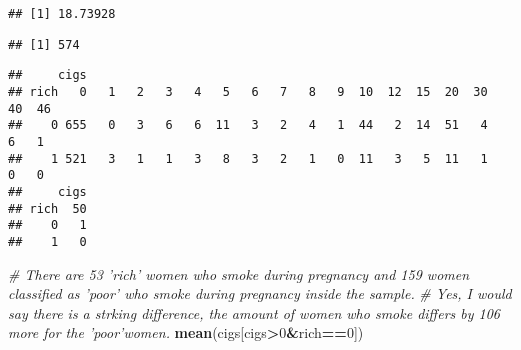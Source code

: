 \documentclass[]{article}
\newenvironment{Shaded}{\begin{snugshade}}{\end{snugshade}}
\newcommand{\CommentTok}[1]{\textcolor[rgb]{0.56,0.35,0.01}{\textit{#1}}}
\newcommand{\DecValTok}[1]{\textcolor[rgb]{0.00,0.00,0.81}{#1}}
\newcommand{\KeywordTok}[1]{\textcolor[rgb]{0.13,0.29,0.53}{\textbf{#1}}}
\newcommand{\NormalTok}[1]{#1}
\newcommand{\OperatorTok}[1]{\textcolor[rgb]{0.81,0.36,0.00}{\textbf{#1}}}
\newcommand{\StringTok}[1]{\textcolor[rgb]{0.31,0.60,0.02}{#1}}
\begin{document}
\begin{verbatim}
## [1] 18.73928
\end{verbatim}

\begin{Shaded}
\end{Shaded}

\begin{verbatim}
## [1] 574
\end{verbatim}

\begin{Shaded}
\end{Shaded}

\begin{verbatim}
##     cigs
## rich   0   1   2   3   4   5   6   7   8   9  10  12  15  20  30  40  46
##    0 655   0   3   6   6  11   3   2   4   1  44   2  14  51   4   6   1
##    1 521   3   1   1   3   8   3   2   1   0  11   3   5  11   1   0   0
##     cigs
## rich  50
##    0   1
##    1   0
\end{verbatim}

\begin{Shaded}
\begin{Highlighting}[]
\CommentTok{# There are 53 'rich' women who smoke during pregnancy and 159 women classified as 'poor' who smoke during pregnancy inside the sample.}
\CommentTok{# Yes, I would say there is a strking difference, the amount of women who smoke differs by 106 more for the 'poor'women. }
\KeywordTok{mean}\NormalTok{(cigs[cigs}\OperatorTok{>}\DecValTok{0}\OperatorTok{&}\NormalTok{rich}\OperatorTok{==}\DecValTok{0}\NormalTok{])}
\end{Highlighting}
\end{Shaded}
\end{document}

